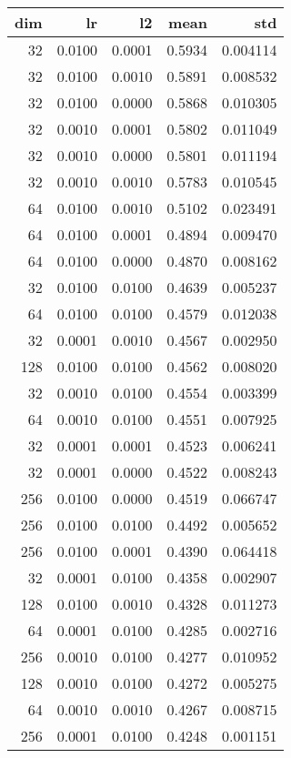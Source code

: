 \begin{tabular}{rrrrr}
\toprule
 dim &      lr &      l2 &    mean &       std \\
\midrule
  32 &  0.0100 &  0.0001 &  0.5934 &  0.004114 \\
  32 &  0.0100 &  0.0010 &  0.5891 &  0.008532 \\
  32 &  0.0100 &  0.0000 &  0.5868 &  0.010305 \\
  32 &  0.0010 &  0.0001 &  0.5802 &  0.011049 \\
  32 &  0.0010 &  0.0000 &  0.5801 &  0.011194 \\
  32 &  0.0010 &  0.0010 &  0.5783 &  0.010545 \\
  64 &  0.0100 &  0.0010 &  0.5102 &  0.023491 \\
  64 &  0.0100 &  0.0001 &  0.4894 &  0.009470 \\
  64 &  0.0100 &  0.0000 &  0.4870 &  0.008162 \\
  32 &  0.0100 &  0.0100 &  0.4639 &  0.005237 \\
  64 &  0.0100 &  0.0100 &  0.4579 &  0.012038 \\
  32 &  0.0001 &  0.0010 &  0.4567 &  0.002950 \\
 128 &  0.0100 &  0.0100 &  0.4562 &  0.008020 \\
  32 &  0.0010 &  0.0100 &  0.4554 &  0.003399 \\
  64 &  0.0010 &  0.0100 &  0.4551 &  0.007925 \\
  32 &  0.0001 &  0.0001 &  0.4523 &  0.006241 \\
  32 &  0.0001 &  0.0000 &  0.4522 &  0.008243 \\
 256 &  0.0100 &  0.0000 &  0.4519 &  0.066747 \\
 256 &  0.0100 &  0.0100 &  0.4492 &  0.005652 \\
 256 &  0.0100 &  0.0001 &  0.4390 &  0.064418 \\
  32 &  0.0001 &  0.0100 &  0.4358 &  0.002907 \\
 128 &  0.0100 &  0.0010 &  0.4328 &  0.011273 \\
  64 &  0.0001 &  0.0100 &  0.4285 &  0.002716 \\
 256 &  0.0010 &  0.0100 &  0.4277 &  0.010952 \\
 128 &  0.0010 &  0.0100 &  0.4272 &  0.005275 \\
  64 &  0.0010 &  0.0010 &  0.4267 &  0.008715 \\
 256 &  0.0001 &  0.0100 &  0.4248 &  0.001151 \\

\end{tabular}
